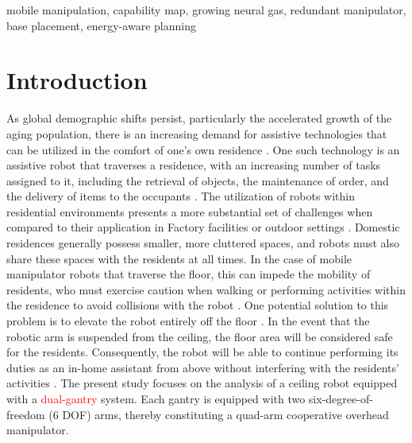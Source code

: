 \documentclass[conference]{IEEEtran}
\begin{document}
\begin{IEEEkeywords}
mobile manipulation, capability map, growing neural gas, redundant manipulator,
base placement, energy-aware planning
\end{IEEEkeywords}

\section{Introduction}

As global demographic shifts persist, particularly the accelerated growth of the aging population, 
there is an increasing demand for assistive technologies that can be utilized in 
the comfort of one's own residence \cite{unitednations2024world,who2025clinical}. 
One such technology is an assistive robot that traverses a residence, with an 
increasing number of tasks assigned to it, including the retrieval of objects, 
the maintenance of order, and the delivery of items to the occupants \cite{IFR2025,Lisondra2026}.
The utilization of robots within residential environments presents a more substantial 
set of challenges when compared to their application in Factory facilities or outdoor settings \cite{kemp2007challenges}. 
Domestic residences generally possess smaller, more cluttered spaces, 
and robots must also share these spaces with the residents at all times. 
In the case of mobile manipulator robots that traverse the floor, this can impede 
the mobility of residents, who must exercise caution when walking or performing 
activities within the residence to avoid collisions with the robot \cite{sisbot2007human}. 
One potential solution to this problem is to elevate the robot entirely off the floor \cite{Lalonde2025}.
In the event that the robotic arm is suspended from the ceiling, 
the floor area will be considered safe for the residents. 
Consequently, the robot will be able to continue performing its duties 
as an in-home assistant from above without interfering with the residents' activities \cite{Kaluarachchi2025}.
The present study focuses on the analysis of a ceiling robot equipped with a \textcolor{red}{dual-gantry} system.
Each gantry is equipped with two six-degree-of-freedom (6 DOF) arms, 
thereby constituting a quad-arm cooperative overhead manipulator.
\end{document}
